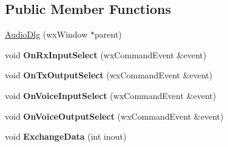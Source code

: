 \subsection*{Public Member Functions}
\begin{DoxyCompactItemize}
\item 
\hyperlink{class_audio_dlg_aca8f77272717136445248c9dce578bed}{Audio\-Dlg} (wx\-Window $\ast$parent)
\item 
\hypertarget{class_audio_dlg_ade43627922e25e984ca4ebff7bf70339}{void {\bfseries On\-Rx\-Input\-Select} (wx\-Command\-Event \&event)}\label{class_audio_dlg_ade43627922e25e984ca4ebff7bf70339}

\item 
\hypertarget{class_audio_dlg_a37703c36702cb622f0ceb152fdcb6d1c}{void {\bfseries On\-Tx\-Output\-Select} (wx\-Command\-Event \&event)}\label{class_audio_dlg_a37703c36702cb622f0ceb152fdcb6d1c}

\item 
\hypertarget{class_audio_dlg_a9e472e745d49396f1d3c8f8907e6601f}{void {\bfseries On\-Voice\-Input\-Select} (wx\-Command\-Event \&event)}\label{class_audio_dlg_a9e472e745d49396f1d3c8f8907e6601f}

\item 
\hypertarget{class_audio_dlg_a2711e45fea17d5f76c2453fc9654b008}{void {\bfseries On\-Voice\-Output\-Select} (wx\-Command\-Event \&event)}\label{class_audio_dlg_a2711e45fea17d5f76c2453fc9654b008}

\item 
\hypertarget{class_audio_dlg_a21490d0af79a4284bc6d76e0e9e24007}{void {\bfseries Exchange\-Data} (int inout)}\label{class_audio_dlg_a21490d0af79a4284bc6d76e0e9e24007}

\end{DoxyCompactItemize}
